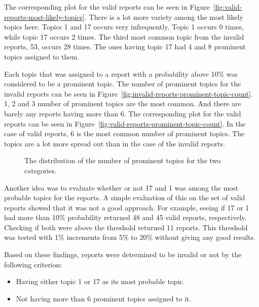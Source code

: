 The corresponding plot for the valid reports can be seen in Figure~\ref{fig:valid-reports-most-likely-topics}.
There is a lot more variety among the most likely topics here.
Topics 1 and 17 occurs very infrequently.
Topic 1 occurs 0 times, while topic 17 occurs 2 times.
The third most common topic from the invalid reports, 53, occurs 28 times.
The ones having topic 17 had 4 and 8 prominent topics assigned to them.

Each topic that was assigned to a report with a probability above 10\% was considered to be a prominent topic.
The number of prominent topics for the invalid reports can be seen in Figure~\ref{fig:invalid-reports-prominent-topic-count}.
1, 2 and 3 number of prominent topics are the most common.
And there are barely any reports having more than 6.
The corresponding plot for the valid reports can be seen in Figure~\ref{fig:valid-reports-prominent-topic-count}.
In the case of valid reports, 6 is the most common number of prominent topics. 
The topics are a lot more spread out than in the case of the invalid reports.

\begin{figure}[h!]
    \centering
    \caption{The distribution of the number of prominent topics for the two categories.}
    \label{fig:prominent-topic-dist}
\end{figure}

Another idea was to evaluate whether or not 17 and 1 was among the most probable topics for the reports.
A simple evaluation of this on the set of valid reports showed that it was not a good approach.
For example, seeing if 17 or 1 had more than 10\% probability returned 48 and 45 valid reports, respectively.
Checking if both were above the threshold returned 11 reports.
This threshold was tested with 1\% increments from 5\% to 20\% without giving any good results.

Based on these findings, reports were determined to be invalid or not by the following criterion:
\begin{itemize}
    \item Having either topic 1 or 17 as its most probable topic.
    \item Not having more than 6 prominent topics assigned to it.
\end{itemize}

